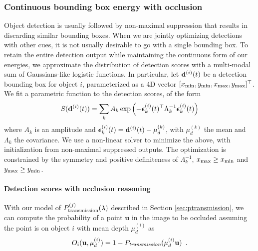 \subsubsection{Continuous bounding box energy with occlusion}

Object detection is usually followed by non-maximal suppression that results in discarding similar bounding boxes. When we are jointly optimizing detections with other cues, it is not usually desirable to go with a single bounding box. To retain the entire detection output while maintaining the continuous form of our energies, we approximate the distribution of detection scores with a multi-modal sum of Gaussians-like logistic functions. In particular, let $\mathbf{d}^{(i)}(t)$ be a detection bounding box for object $i$, parameterized as a 4D vector $[x_{\text{min}}, y_{\text{min}}, x_{\text{max}}, y_{\text{max}}]^\top$. We fit a parametric function to the detection scores, of the form
\begin{equation}
S(\mathbf{d}^{(i)}(t)) = \sum_k A_k \exp \left( -{\bm{\epsilon}}_k^{(i)}(t)^\top \Lambda_k^{-1} {\bm{\epsilon}}_k^{(i)}(t) \right)
\end{equation}
where $A_k$ is an amplitude and ${\bm{\epsilon}}_k^{(i)}(t) = \mathbf{d}^{(i)}(t)-\mu^{(k)}_d$, with $\mu^{(k)}_d$ the mean and $\Lambda_k$ the covariance.
We use a non-linear solver to minimize the above, with initialization from non-maximal suppressed outputs. The optimization is constrained by the symmetry and positive definiteness of $\Lambda_k^{-1}$, $x_{\text{max}} \ge x_{\text{min}}$ and $y_{\text{max}} \ge y_{\text{min}}$.

\paragraph{Detection scores with occlusion reasoning} 
\def\u{\mathbf{u}}
With our model of $P^{(j)}_{\text{transmission}}(\lambda)$ described in Section \ref{sec:ptransmission}, we can
compute the probability of a point $\u$ in the image to be occluded assuming
the point is on object $i$ with mean depth $\mu^{(i)}_d$ as
\begin{align}
  O_{i}(\u, \mu^{(i)}_d) = 1 - \Ptransmission(\mu^{(i)}_d\u) \enspace .
\end{align}

